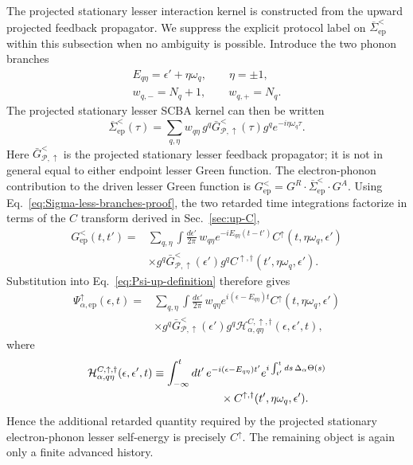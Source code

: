 \documentclass[
 reprint,
 superscriptaddress,
 amsmath,amssymb,
 aps,prb,
 longbibliography,
 floatfix
]{revtex4-2}
\newcommand{\ep}{\mathrm{ep}}
\newcommand{\barSigma}{\overline{\Sigma}}
\begin{document}
The projected stationary lesser interaction kernel is constructed from the upward projected feedback propagator. We suppress the explicit protocol label on $\barSigma_{\ep}^<$ within this subsection when no ambiguity is possible. Introduce the two phonon branches
\begin{equation*}
\begin{gathered}
E_{q\eta}
=
\epsilon'+\eta\omega_q,
\qquad
\eta=\pm1,
\\
w_{q,-}=N_q+1,
\qquad
w_{q,+}=N_q.
\end{gathered}
\end{equation*}
The projected stationary lesser SCBA kernel can then be written
\begin{equation}
\barSigma_{\ep}^<(\tau)
=
\sum_{q,\eta}
w_{q\eta}\,
g^q
\bar G_{\mathcal P,\uparrow}^{<}(\tau)
g^q
e^{-i\eta\omega_q\tau}.
\label{eq:Sigma-less-branches-proof}
\end{equation}
Here \(\bar G_{\mathcal P,\uparrow}^{<}\) is the projected stationary lesser feedback propagator; it is not in general equal to either endpoint lesser Green function. The electron-phonon contribution to the driven lesser Green function is $G_{\ep}^< = G^R\cdot \barSigma_{\ep}^< \cdot G^A$. Using Eq.~\eqref{eq:Sigma-less-branches-proof}, the two retarded time integrations factorize in terms of the $C$ transform derived in Sec.~\ref{sec:up-C},
\begin{equation*}
\begin{aligned}
G_{\ep}^<(t,t')
={}&
\sum_{q,\eta}
\int\frac{d\epsilon'}{2\pi}\,
w_{q\eta}
e^{-iE_{q\eta}(t-t')}
C^\uparrow(t,\eta\omega_q,\epsilon')
\\
&\times
g^q
\bar G_{\mathcal P,\uparrow}^{<}(\epsilon')
g^q
C^{\uparrow,\dagger}
(t',\eta\omega_q,\epsilon').
\end{aligned}
\end{equation*}
Substitution into Eq.~\eqref{eq:Psi-up-definition} therefore gives
\begin{equation}
\begin{aligned}
\Psi_{\alpha,\ep}^\uparrow(\epsilon,t)
={}&
\sum_{q,\eta}
\int\frac{d\epsilon'}{2\pi}\,
w_{q\eta}
e^{i(\epsilon-E_{q\eta})t}
C^\uparrow(t,\eta\omega_q,\epsilon')
\\
&\times
g^q
\bar G_{\mathcal P,\uparrow}^{<}(\epsilon')
g^q
\mathcal H_{\alpha,q\eta}^{C,\uparrow,\dagger}
(\epsilon,\epsilon',t),
\end{aligned}
\label{eq:Psi-ep-before-D}
\end{equation}
where
\begin{align}
&\mathcal H_{\alpha,q\eta}^{C,\uparrow,\dagger}
(\epsilon,\epsilon',t)
\equiv
\int_{-\infty}^{t}dt'\,
e^{-i(\epsilon-E_{q\eta})t'}
e^{i\int_{t'}^t ds\,
\Delta_\alpha\Theta(s)} \notag
\\
&\qquad\qquad\qquad\qquad\qquad\qquad\times
C^{\uparrow,\dagger}
(t',\eta\omega_q,\epsilon').
\label{eq:H-C-up-def}
\end{align}
Hence the additional retarded quantity required by the projected stationary electron-phonon lesser self-energy is precisely $C^\uparrow$. The remaining object is again only a finite advanced history.
\end{document}
